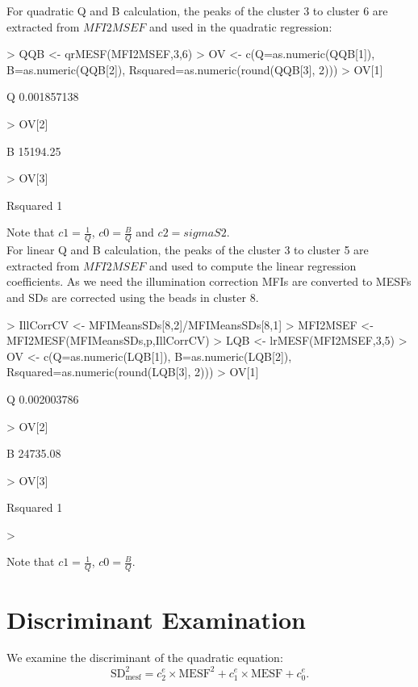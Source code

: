 \documentclass{article}
\begin{document}
For quadratic Q and B calculation, the peaks of the cluster  3 to  cluster 6 are extracted from $MFI2MSEF$ and used in the quadratic regression:

\begin{Schunk}
\begin{Sinput}
> QQB <- qrMESF(MFI2MSEF,3,6)
> OV <- c(Q=as.numeric(QQB[1]), B=as.numeric(QQB[2]), Rsquared=as.numeric(round(QQB[3], 2)))
> OV[1]
\end{Sinput}
          Q 
0.001857138 \begin{Sinput}
> OV[2]
\end{Sinput}
       B 
15194.25 \begin{Sinput}
> OV[3]
\end{Sinput}
Rsquared 
       1 \end{Schunk}

Note that $c1 =\frac{1}{Q}$, $c0=\frac{B}{Q}$ and $c2=sigmaS2$. \\

For linear Q and B calculation, the peaks of the cluster  3 to cluster 5 are extracted from $MFI2MSEF$ and  used to compute the linear regression coefficients. 
As we need the illumination correction MFIs are converted to MESFs and SDs are corrected using the beads in cluster 8.

\begin{Schunk}
\begin{Sinput}
> IllCorrCV <- MFIMeansSDs[8,2]/MFIMeansSDs[8,1]	
> MFI2MSEF <- MFI2MESF(MFIMeansSDs,p,IllCorrCV)
> LQB <- lrMESF(MFI2MSEF,3,5)
> OV <- c(Q=as.numeric(LQB[1]), B=as.numeric(LQB[2]), Rsquared=as.numeric(round(LQB[3], 2)))
> OV[1]
\end{Sinput}
          Q 
0.002003786 \begin{Sinput}
> OV[2]
\end{Sinput}
       B 
24735.08 \begin{Sinput}
> OV[3]
\end{Sinput}
Rsquared 
       1 \begin{Sinput}
> 
\end{Sinput}
\end{Schunk}

Note that $c1 =\frac{1}{Q}$, $c0=\frac{B}{Q}$.

\section{Discriminant Examination}\label{DELTA}

We examine the discriminant of the quadratic equation:
\begin{equation}
\text{SD}_{\text{mesf}}^{2} =c^{e}_{2} \times \text{MESF}^{2}+ c^{e}_{1} \times \text{MESF}  +  c^{e}_{0}.
\end{equation}
\end{document}
